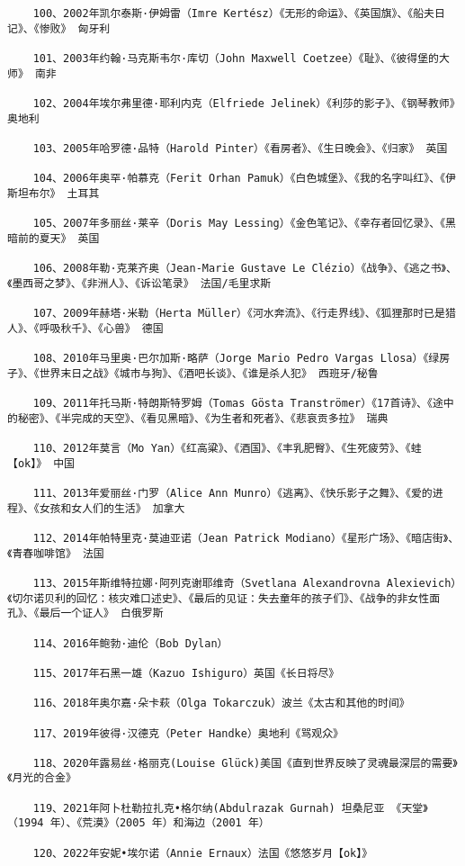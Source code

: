 \documentclass[UTF8]{../RepresentationUniverse}
\begin{document}
\begin{lstlisting}
    100、2002年凯尔泰斯·伊姆雷（Imre Kertész）《无形的命运》、《英国旗》、《船夫日记》、《惨败》 匈牙利
    
    101、2003年约翰·马克斯韦尔·库切（John Maxwell Coetzee）《耻》、《彼得堡的大师》 南非
    
    102、2004年埃尔弗里德·耶利内克（Elfriede Jelinek）《利莎的影子》、《钢琴教师》 奥地利
    
    103、2005年哈罗德·品特（Harold Pinter）《看房者》、《生日晚会》、《归家》 英国
    
    104、2006年奥罕·帕慕克（Ferit Orhan Pamuk）《白色城堡》、《我的名字叫红》、《伊斯坦布尔》 土耳其
    
    105、2007年多丽丝·莱辛（Doris May Lessing）《金色笔记》、《幸存者回忆录》、《黑暗前的夏天》 英国
    
    106、2008年勒·克莱齐奥（Jean-Marie Gustave Le Clézio）《战争》、《逃之书》、《墨西哥之梦》、《非洲人》、《诉讼笔录》 法国/毛里求斯
    
    107、2009年赫塔·米勒（Herta Müller）《河水奔流》、《行走界线》、《狐狸那时已是猎人》、《呼吸秋千》、《心兽》 德国
    
    108、2010年马里奥·巴尔加斯·略萨（Jorge Mario Pedro Vargas Llosa）《绿房子》、《世界末日之战》《城市与狗》、《酒吧长谈》、《谁是杀人犯》 西班牙/秘鲁
    
    109、2011年托马斯·特朗斯特罗姆（Tomas Gösta Tranströmer）《17首诗》、《途中的秘密》、《半完成的天空》、《看见黑暗》、《为生者和死者》、《悲哀贡多拉》 瑞典
    
    110、2012年莫言（Mo Yan）《红高粱》、《酒国》、《丰乳肥臀》、《生死疲劳》、《蛙【ok】》 中国
    
    111、2013年爱丽丝·门罗（Alice Ann Munro）《逃离》、《快乐影子之舞》、《爱的进程》、《女孩和女人们的生活》 加拿大
    
    112、2014年帕特里克·莫迪亚诺（Jean Patrick Modiano）《星形广场》、《暗店街》、《青春咖啡馆》 法国
    
    113、2015年斯维特拉娜·阿列克谢耶维奇（Svetlana Alexandrovna Alexievich）《切尔诺贝利的回忆：核灾难口述史》、《最后的见证：失去童年的孩子们》、《战争的非女性面孔》、《最后一个证人》 白俄罗斯
    
    114、2016年鲍勃·迪伦（Bob Dylan）
    
    115、2017年石黑一雄（Kazuo Ishiguro）英国《长日将尽》
    
    116、2018年奥尔嘉·朵卡萩（Olga Tokarczuk）波兰《太古和其他的时间》
    
    117、2019年彼得·汉德克（Peter Handke）奥地利《骂观众》
    
    118、2020年露易丝·格丽克(Louise Glück)美国《直到世界反映了灵魂最深层的需要》《月光的合金》
    
    119、2021年阿卜杜勒拉扎克•格尔纳(Abdulrazak Gurnah) 坦桑尼亚 《天堂》（1994 年）、《荒漠》（2005 年）和海边（2001 年）

    120、2022年安妮•埃尔诺（Annie Ernaux）法国《悠悠岁月【ok】》
\end{lstlisting}
\end{document}
